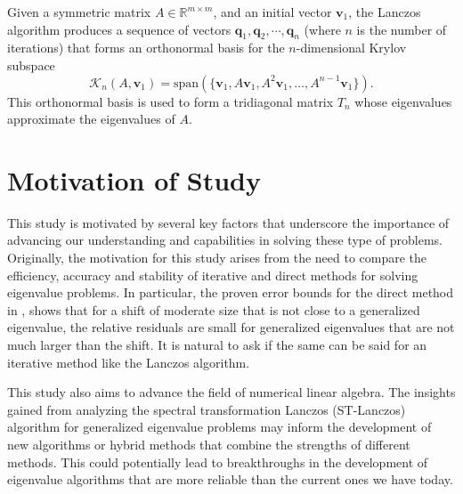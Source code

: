 Given a symmetric matrix $A \in \mathbb{R}^{m\times m}$, and an initial vector $\mathbf{v}_1$, the Lanczos algorithm produces a sequence of vectors $\mathbf{q}_1, \mathbf{q}_2, \cdots, \mathbf{q}_n$ (where $n$ is the number of iterations) that forms an orthonormal basis for the $n$-dimensional Krylov subspace
\begin{equation}\label{eq:KrylovSubspaceDefinition}
       \mathcal{K}_n(A, \mathbf{v}_1) = \text{span}(\{\mathbf{v}_1, A\mathbf{v}_1, A^2\mathbf{v}_1, \ldots, A^{n-1}\mathbf{v}_1\}).
\end{equation}
This orthonormal basis is used to form a tridiagonal matrix $T_n$ whose eigenvalues approximate the eigenvalues of $A$.

\section{Motivation of Study}\label{sec:MotivationOfStudy}

This study is motivated by several key factors that underscore the importance of advancing our understanding and capabilities in solving these type of problems. Originally, the motivation for this study arises from the need to compare the efficiency, accuracy and stability of iterative and direct methods for solving eigenvalue problems. In particular, the proven error bounds for the direct method in \cite{stewart2024spectraltransformationdensesymmetric}, shows that for a shift of moderate size that is not close to a generalized eigenvalue, the relative residuals are small for generalized eigenvalues that are not much larger than the shift. It is natural to ask if the same can be said for an iterative method like the Lanczos algorithm.

This study also aims to advance the field of numerical linear algebra. The insights gained from analyzing the spectral transformation Lanczos (ST-Lanczos) algorithm for generalized eigenvalue problems may inform the development of new algorithms or hybrid methods that combine the strengths of different methods. This could potentially lead to breakthroughs in the development of eigenvalue algorithms that are more reliable than the current ones we have today.



